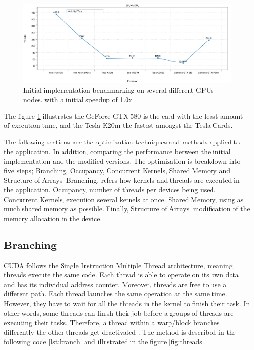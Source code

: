   \begin{figure}[htbp]
	\centering
		\includegraphics[width=1.0\textwidth]{Figures/gpu_initial.png}
		\smallskip
	\caption[Initial GPU results]{Initial implementation benchmarking on several different GPUs nodes, with a initial speedup of 1.0x}
	\label{fig:iniresults}
\end{figure}

The figure \ref{fig:iniresults} illustrates the GeForce GTX 580 is the card with the least amount of execution time, and the Tesla K20m the fastest amongst the Tesla Cards. 


The following sections are the optimization techniques and methods applied to the application. In addition, comparing the performance between the initial implementation and the modified versions. The optimization is breakdown into five steps; Branching, Occupancy, Concurrent Kernels, Shared Memory and Structure of Arrays. Branching, refers how kernels and threads are executed in the application. Occupancy, number of threads per devices being used. Concurrent Kernels, execution several kernels at once. Shared Memory, using as much shared memory as possible. Finally, Structure of Arrays, modification of the memory allocation in the device.

 \subsection{Branching}
 
 CUDA follows the Single Instruction Multiple Thread architecture, meaning, threads execute the same code. Each thread is able to operate on its own data and has its individual address counter. Moreover, threads are free to use a different path. Each thread launches the same operation at the same time. However, they have to wait for all the threads in the kernel to finish their task. In other words, some threads can finish their job before a groups of threads are executing their tasks. Therefore, a thread within a warp/block branches differently the other threads get deactivated \cite{hoermanngpu}. The method is described in the following code \ref{lst:branch} and  illustrated in the figure \ref{fig:threads}.

